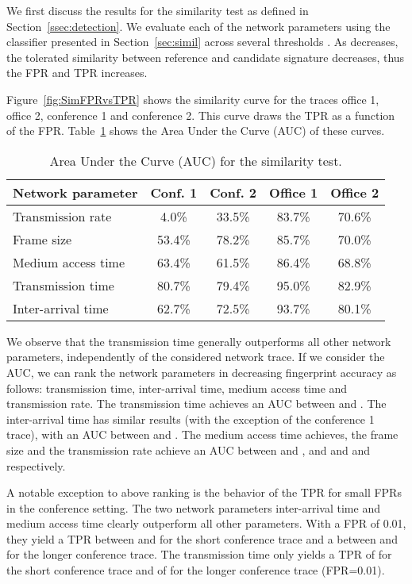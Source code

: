\documentclass[10pt, conference, compsocconf, letterpaper]{IEEEtran}
\begin{document}
We first discuss the results for the similarity test as defined in Section~\ref{ssec:detection}.
We evaluate each of the network parameters using the classifier presented in Section~\ref{sec:simil} across several thresholds . As  decreases, the tolerated similarity between reference and candidate signature decreases, thus the FPR and TPR increases.


Figure~\ref{fig:SimFPRvsTPR} shows the similarity  curve for the traces office 1, office 2, conference 1 and conference 2. This curve draws the TPR as a function of the FPR. Table~\ref{tab:simauc} shows the Area Under the Curve (AUC) of these curves.


\begin{table}
{\footnotesize
\begin{center}
\begin{tabular}{l|c|c|c|c}
Network parameter  &  Conf. 1 & Conf. 2 &  Office 1 & Office 2 \\
\hline
Transmission rate& 4.0\%&33.5\%&83.7\%&70.6\%\\
Frame size&  53.4\%& 78.2\%&85.7\%&70.0\%\\
Medium access time&  63.4\%& 61.5\%&86.4\%&68.8\%\\
Transmission time&  80.7\%& 79.4\%&95.0\%&82.9\%\\
Inter-arrival time&  62.7\%& 72.5\%&93.7\%&80.1\%\\
\end{tabular}
\end{center}
}
\caption{Area Under the Curve (AUC) for the similarity test.}
\label{tab:simauc}
\end{table}

We observe that the transmission time generally outperforms all other network parameters, independently of the considered network trace.
If we consider the AUC, we can rank the network parameters in decreasing fingerprint accuracy as follows: transmission time, inter-arrival time, medium access time and transmission rate.
The transmission time achieves an AUC between  and . The inter-arrival time has similar results (with the exception of the conference 1 trace), with an AUC between  and . 
The medium access time achieves, the frame size and the transmission rate achieve an AUC between  and ,  and  and  and  respectively.

A notable exception to above ranking is the behavior of the TPR for small FPRs in the conference setting. The two network parameters inter-arrival time and medium access time clearly outperform all other parameters.
With a FPR of 0.01, they yield a TPR between  and  for the short conference trace and a between  and  for the longer conference trace.
The transmission time only yields a TPR of  for the short conference trace and of  for the longer conference trace (FPR=0.01).
\end{document}
